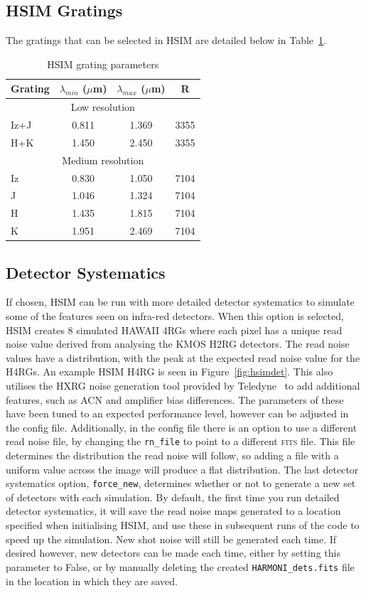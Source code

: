 \documentclass[12pt]{report}
\begin{document}
\subsection{HSIM Gratings}

The gratings that can be selected in HSIM are detailed below in Table~\ref{tab:gratings}.
\begin{table}[!h]
\centering
\caption{HSIM grating parameters}
\label{tab:gratings}
\begin{tabular}{lccc}
\hline
Grating & $\lambda_{min}$ ($\mu$m) & $\lambda_{max}$ ($\mu$m) & R \\
\hline
\multicolumn{4}{c}{Low resolution}\\
\hline
Iz+J & 0.811 & 1.369 & 3355 \\
H+K & 1.450 & 2.450 & 3355 \\
\hline
\multicolumn{4}{c}{Medium resolution}\\
\hline
Iz & 0.830 & 1.050 & 7104 \\
J & 1.046 & 1.324 & 7104 \\
H & 1.435 & 1.815 & 7104 \\
K & 1.951 & 2.469 & 7104\\
\hline
\end{tabular}
\end{table}

\subsection{Detector Systematics}

If chosen, HSIM can be run with more detailed detector systematics to simulate some of the features seen on infra-red detectors. When this option is selected, HSIM creates 8 simulated HAWAII 4RGs where each pixel has a unique read noise value derived from analysing the KMOS H2RG detectors. The read noise values have a distribution, with the peak at the expected read noise value for the H4RGs. An example HSIM H4RG is seen in Figure~\ref{fig:hsimdet}. This also utilises the HXRG noise generation tool provided by Teledyne~\citep{Rauscher2015} to add additional features, such as ACN and amplifier bias differences. The parameters of these have been tuned to an expected performance level, however can be adjusted in the config file.  Additionally, in the config file there is an option to use a different read noise file, by changing the \texttt{rn\_file} to point to a different \textsc{fits} file. This file determines the distribution the read noise will follow, so adding a file with a uniform value across the image will produce a flat distribution. The last detector systematics option, \texttt{force\_new}, determines whether or not to generate a new set of detectors with each simulation. By default, the first time you run detailed detector systematics, it will save the read noise maps generated to a location specified when initialising HSIM, and use these in subsequent runs of the code to speed up the simulation. New shot noise will still be generated each time. If desired however, new detectors can be made each time, either by setting this parameter to False, or by manually deleting the created \texttt{HARMONI\_dets.fits} file in the location in which they are saved.
\end{document}
